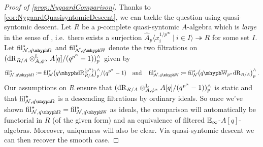 \documentclass[DIV=12,numbers=enddot,leqno,bibliography=totoc]{scrartcl}
\begin{document}
	\begin{proof}[Proof of \cref{prop:NygaardComparison}]
		Thanks to \cref{cor:NygaardQuasisyntomicDescent}, we can tackle the question using quasi-syntomic descent. Let $R$ be a $p$-complete quasi-syntomic $A$-algebra which is \emph{large} in the sense of \cite[Definition~]{Prismatic}, i.e.\ there exists a surjection $\widehat{A}_p\langle x_i^{1/p^\infty}\ |\ i\in I\rangle \twoheadrightarrow R$ for some set $I$. Let $ \fil_{\Nn,  \qOmega}^\star $ and $ \fil_{\Nn, \qIW}^\star $ denote the two filtrations on $(\mathrm{dR}_{R/A}\otimes^{\mathrm{L}}_{A,\phi^\alpha}A[q]/(q^{p^\alpha}-1))_p^\wedge$ given by
		\begin{equation*}
			\fil_{\Nn,  \qOmega}^\star \coloneqq  \fil_\Nn^\star \bigl(\qdeRham_{R/A}^{(p^\alpha)}\bigr)_p^\complete/(q^{p^\alpha}-1)\quad\text{and}\quad  \fil_{\Nn, \qIW}^\star \coloneqq  \fil_\Nn^\star \left(\qIW_{p^\alpha}\deRham_{R/A}\right)_p^\complete\,.
		\end{equation*}
		Our assumptions on $R$ ensure that $(\mathrm{dR}_{R/A}\otimes^{\mathrm{L}}_{A,\phi^\alpha}A[q]/(q^{p^\alpha}-1))_p^\wedge$ is static and that $ \fil_{\Nn,  \qOmega}^\star $ is a descending filtrations by ordinary ideals. So once we've shown $ \fil_{\Nn,  \qOmega}^\star = \fil_{\Nn, \qIW}^\star $ as ideals, the comparison will automatically be functorial in $R$ (of the given form) and an equivalence of filtered $\mathbb{E}_\infty$-$A[q]$-algebras. Moreover, uniqueness will also be clear. Via quasi-syntomic descent we can then recover the smooth case.
		

\end{proof}
\end{document}
